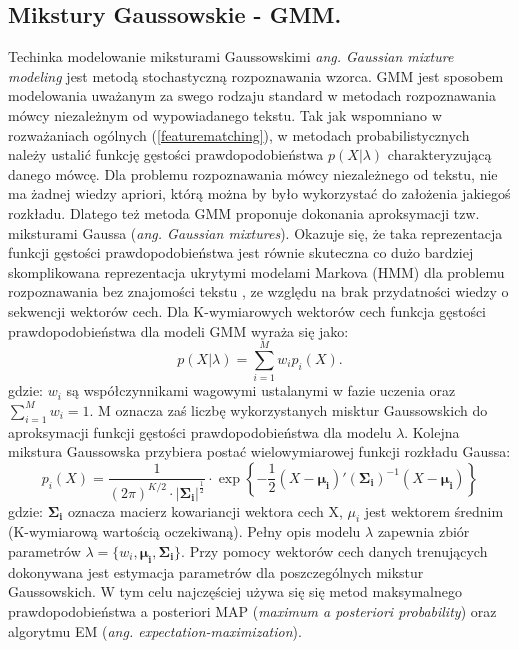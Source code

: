 \subsection{Mikstury Gaussowskie - GMM.}
Techinka modelowanie miksturami Gaussowskimi {\textit{ang. Gaussian mixture modeling}} jest metodą stochastyczną rozpoznawania wzorca. GMM jest sposobem modelowania uważanym za swego rodzaju standard w metodach rozpoznawania mówcy niezależnym od wypowiadanego tekstu. Tak jak wspomniano w rozważaniach ogólnych (\ref{featurematching}), w metodach probabilistycznych należy ustalić funkcję gęstości prawdopodobieństwa $p(X|\lambda)$ charakteryzującą danego mówcę. Dla problemu rozpoznawania mówcy niezależnego od tekstu, nie ma żadnej wiedzy apriori, którą można by było wykorzystać do założenia jakiegoś rozkładu. Dlatego też metoda GMM proponuje dokonania aproksymacji tzw. miksturami Gaussa (\textit{ang. Gaussian mixtures}). Okazuje się, że taka reprezentacja funkcji gęstości prawdopodobieństwa jest równie skuteczna co dużo bardziej skomplikowana reprezentacja ukrytymi modelami Markova (HMM) dla problemu rozpoznawania bez znajomości tekstu \cite{reynolds}, ze względu na brak przydatności wiedzy o sekwencji wektorów cech. Dla K-wymiarowych wektorów cech funkcja gęstości prawdopodobieństwa dla modeli GMM wyraża się jako:
\begin{equation}
  p(X|\lambda) = \sum^{M}_{i=1} w_ip_i(X).
\end{equation}
gdzie: $w_i$ są współczynnikami wagowymi ustalanymi w fazie uczenia oraz $\sum_{i=1}^{M} w_i =1$. M oznacza zaś liczbę wykorzystanych misktur Gaussowskich do aproksymacji funkcji gęstości prawdopodobieństwa dla modelu $ \lambda$. Kolejna mikstura Gaussowska przybiera postać wielowymiarowej funkcji rozkładu Gaussa:
\begin{equation}
  p_i(X)=\frac{1}{(2\pi)^{K/2} \cdot |\bm{\Sigma_i}|^{\frac{1}{2}}} \cdot \exp\left\{-\frac{1}{2}(X- \bm{\mu_i})'(\bm{\Sigma_i})^{-1}(X-\bm{\mu_i})\right\}
\end{equation}
gdzie: $\bm{\Sigma_i}$ oznacza macierz kowariancji wektora cech X, $\mu_i$ jest wektorem średnim (K-wymiarową wartością oczekiwaną). Pełny opis modelu $\lambda$ zapewnia zbiór parametrów $\lambda = \{w_i,\bm{\mu_i},\bm{\Sigma_i} \}$. Przy pomocy wektorów cech danych trenujących dokonywana jest estymacja parametrów dla poszczególnych mikstur Gaussowskich. W tym celu najczęściej używa się się metod maksymalnego prawdopodobieństwa a posteriori MAP (\textit{maximum a posteriori probability}) oraz algorytmu EM (\textit{ang. expectation-maximization}).
